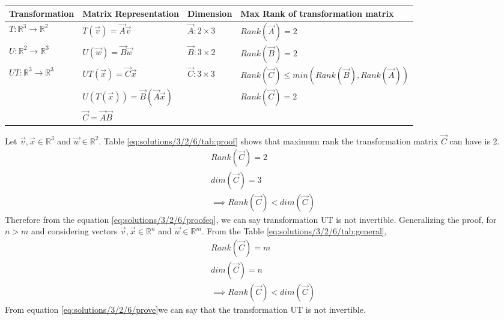 \begin{table*}[h!]
\begin{center}
\begin{tabular}{|l|l|l|l|}
\hline
\textbf{Transformation}&\textbf{Matrix Representation}&\textbf{Dimension}&\textbf{Max Rank  of transformation matrix}\\[0.5ex]
\hline
$T:\mathbb{R}^3\rightarrow\mathbb{R}^2$ & $T(\vec{v})=\vec{A}\vec{v}$ & $\vec{A}:2\times 3$ & $Rank(\vec{A})=2$\\[0.5ex]
\hline
$U:\mathbb{R}^2\rightarrow\mathbb{R}^3$ & $U(\vec{w})=\vec{B}\vec{w}$ & $\vec{B}:3\times 2$ & $Rank(\vec{B})=2$\\[0.5ex]
\hline
$UT:\mathbb{R}^3\rightarrow\mathbb{R}^3$ & $UT(\vec{x})=\vec{C}\vec{x}$ & $\vec{C}:3\times 3$ & $Rank(\vec{C})\le min(Rank(\vec{B}),Rank(\vec{A}))$\\[0.5ex]
&$U(T(\vec{x}))=\vec{B}(\vec{A}\vec{x})$&&$Rank(\vec{C})=2$\\[0.5ex]
&$\vec{C}=\vec{A}\vec{B}$&&\\[0.5ex]
\hline
\end{tabular}
\caption{Proof for non-invertibility of the transformation UT where $T:\mathbb{R}^3\rightarrow\mathbb{R}^2$ and $U:\mathbb{R}^2\rightarrow\mathbb{R}^3$}
\label{eq:solutions/3/2/6/tab:proof}
\end{center}
\vspace{0.5cm}
\end{table*}
Let $\vec{v},\vec{x}\in\mathbb{R}^3$ and $\vec{w}\in\mathbb{R}^2$. Table \ref{eq:solutions/3/2/6/tab:proof} shows that maximum rank the transformation matrix $\vec{C}$ can have is 2. 
\begin{align}
Rank(\vec{C})=2\\
dim(\vec{C})=3\\
\implies Rank(\vec{C})<dim(\vec{C})\label{eq:solutions/3/2/6/proofeq}
\end{align}
Therefore from the equation \eqref{eq:solutions/3/2/6/proofeq}, we can say transformation UT is not invertible.
Generalizing the proof, for $n>m$ and considering vectors $\vec{v},\vec{x}\in\mathbb{R}^n$ and $\vec{w}\in\mathbb{R}^m$. From the Table \ref{eq:solutions/3/2/6/tab:general}, 
\begin{align}
Rank(\vec{C})=m\\
dim(\vec{C})=n\\
\implies Rank(\vec{C})<dim(\vec{C})\label{eq:solutions/3/2/6/prove}
\end{align}
From equation \eqref{eq:solutions/3/2/6/prove}we can say that the transformation UT is not invertible. 
